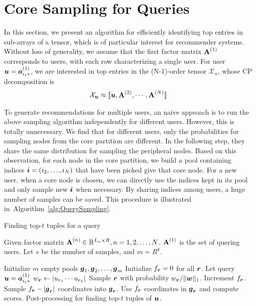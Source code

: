 \documentclass[letterpaper]{article}
\newcommand{\T}[1]{\mathcal{#1}}
\newcommand{\KT}[1]{\llbracket #1 \rrbracket}
\newcommand{\V}[1]{{\boldsymbol{{\MakeLowercase{#1}}}}}
\newcommand{\RowVecA}[1]{\V{a}^{(#1)}_{i_#1*}}
\newcommand{\M}[1]{{\textbf{{\MakeUppercase{#1}}}}}
\newcommand{\FacMat}[2]{\M{#1}^{(#2)}}
\newcommand{\norm}[2]{\|#1\|_{#2}}
\newcommand{\Alg}[1]{Algorithm~\ref{alg:#1}}
\begin{document}
\section{Core Sampling for Queries}

In this section, 
we present an algorithm for efficiently identifying top entries in sub-arrays of a tensor,
which is of particular interest for recommender systems. 
Without loss of generality, 
we assume that the first factor matrix $\FacMat{A}{1}$ corresponds to users, 
with each row characterizing a single user. 
For user $\V{u} = \RowVecA{1}$, 
we are interested in top entries in the (N-1)-order tensor $\T{X}_u$,
whose CP decomposition is
\begin{align}
    \T{X}_{\V{u}} \approx \KT{\V{u},\FacMat{A}{2},\cdots,\FacMat{A}{N}} 
\end{align}

To generate recommendations for multiple users, 
an naive approach is to run the above sampling algorithm independently for different users. 
However, this is totally unnecessary. 
We find that for different users, 
only the probabilities for sampling nodes from the core partition are different. 
In the following step, they share the same distribution for sampling the peripheral nodes. 
Based on this observation, for each node in the core partition, 
we build a pool containing indices $\V{i}=(i_2,\ldots,i_N)$ that have been picked give that core node. 
For a new user, when a core node is chosen, 
we can directly use the indices kept in its pool and only sample new $\V{i}$ when necessary. 
By sharing indices among users, a huge number of samples can be saved. 
This procedure is illustrated in~\Alg{QuerySampling}.

\begin{algorithm}[]
    \caption{Finding top-$t$ tuples for a query}
    \label{alg:QuerySampling}
        Given factor matrix $\FacMat{A}{n}\in \mathbb{R}^{L_n\times R}, n = 1,2,\ldots,N$.
        $\FacMat{A}{1}$ is the set of quering users.
        Let $s$ be the number of samples, and $m=R^k$.
    \begin{algorithmic}[1]
    \State Initialize $m$ empty pools $\V{g}_1,\V{g}_2,\ldots,\V{g}_m$
    \State Initialize $f_{\V{r}} = 0$ for all $\V{r}$.
    \State Let query $\V{u}=\RowVecA{1}$
    \ForAll{$\V{r}$}
    \State $w_\V{r} \leftarrow |u_{r_1}\cdots u_{r_k}|$
    \EndFor
    \State Sample $\V{r}$ with probability $w_\V{r}/\norm{\V{W}}{1}$.
    \label{line:Indexes}
    \State  Increment $f_{\V{r}}$.
    \EndFor
    \ForAll {$\V{r}$}
    \If {$f_\V{r} > |\V{g}_\V{r}|$ }
    \State Sample $f_{\V{r}} - |\V{g}_{\V{r}}|$ coordinates into $\V{g}_{\V{r}}$.
    \EndIf
    \State Use $f_{\V{r}}$ coordinates in $\V{g}_{\V{r}}$ and compute scores.
    \EndFor
    \State Post-processing for finding top-$t$ tuples of $\V{u}$.
    \EndFor
    \end{algorithmic}
\end{algorithm}
\end{document}
